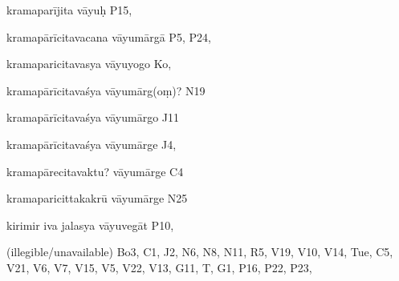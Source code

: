 \begin{ekdosis}
\begin{marma}[hp01_055]
\begin{marma}[hp02_009]
\begin{marma}[hp02_011]
\begin{marma}[hp02_26c]
\item[kramaparījita vāyuḥ] P15, 
\item[kramapārīcitavacana vāyumārgā] P5, P24, 
\item[kramaparicitavasya vāyuyogo] Ko,
\item[kramapārīcitavaśya vāyumārg(oṃ)?] N19
\item[kramapārīcitavaśya vāyumārgo] J11
\item[kramapārīcitavaśya vāyumārge] J4, 
\item[kramapārecitavaktu? vāyumārge] C4
\item[kramaparicittakakrū vāyumārge] N25
\item[kirimir iva jalasya vāyuvegāt] P10, 
\item[(illegible/unavailable)] Bo3, C1, J2, N6, N8, N11, R5, V19, V10, V14, Tue, C5, V21, V6, V7, V15, V5, V22, V13, G11, T, G1, P16, P22, P23, 
  \begin{description}
    \end{description}
 \end{marma}


\end{marma}
\end{marma}
\end{marma}
\end{ekdosis}
